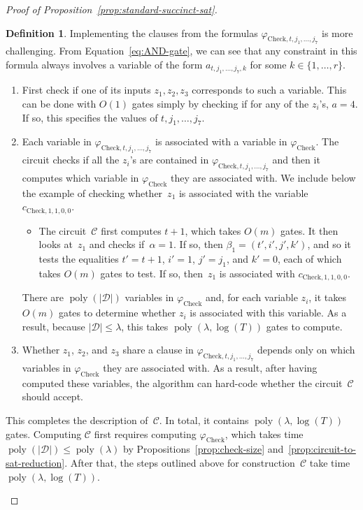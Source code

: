 \documentclass[11pt]{article}
\theoremstyle{definition}
\newtheorem{definition}[theorem]{Definition}
\DeclareMathOperator{\poly}{poly}
\newcommand{\decider}{\mathcal{D}}
\newcommand{\circuit}{\mathcal{C}}
\begin{document}
\begin{proof}[Proof of Proposition~\ref{prop:standard-succinct-sat}]
\begin{definition}
  Implementing the clauses from the formulas $\varphi_{\mathrm{Check}, t, j_1,
    \ldots, j_7}$ is more challenging.
  From Equation~\eqref{eq:AND-gate}, we can see that any constraint in this
  formula always involves a variable of the form $a_{t, j_1, \ldots, j_7, k}$
  for some $k \in \{1, \ldots, r\}$.
  \begin{enumerate}
  \item First check if one of its inputs $z_1, z_2, z_3$ corresponds to such a
    variable.
    This can be done with $O(1)$ gates simply by checking if for any of the
    $z_i$'s, $a = 4$.
    If so, this specifies the values of $t, j_1, \ldots, j_7$.
  \item Each variable in $\varphi_{\mathrm{Check}, t, j_1, \ldots, j_7}$ is
    associated with a variable in $\varphi_{\mathrm{Check}}$.
    The circuit checks if all the $z_i$'s are contained in
    $\varphi_{\mathrm{Check}, t, j_1, \ldots, j_7}$ and then it computes which
    variable in $\varphi_{\mathrm{Check}}$ they are associated with.
    We include below the example of checking whether~$z_1$ is associated with
    the variable $c_{\mathrm{Check},1, 1, 0, 0}$.
    \begin{itemize}
    \item The circuit~$\circuit$ first computes $t+1$, which takes $O(m)$ gates.
      It then looks at~$z_1$ and checks if~$\alpha=1$.
      If so, then $\beta_1 = (t', i', j', k')$, and so it tests the equalities
      $t' = t+1$, $i' = 1$, $j' = j_1$, and $k' = 0$, each of which takes $O(m)$
      gates to test.
      If so, then~$z_1$ is associated with $c_{\mathrm{Check},1, 1, 0, 0}$.
    \end{itemize}
    There are $\poly(|\decider|)$ variables in $\varphi_{\mathrm{Check}}$ and,
    for each variable $z_i$, it takes $O(m)$ gates to determine whether $z_i$ is
    associated with this variable.
    As a result, because $|\decider| \leq \lambda$, this takes $\poly(\lambda,
    \log(T))$ gates to compute.
  \item Whether $z_1$, $z_2$, and $z_3$ share a clause in
    $\varphi_{\mathrm{Check}, t, j_1, \ldots, j_7}$ depends only on which
    variables in $\varphi_{\mathrm{Check}}$ they are associated with.
    As a result, after having computed these variables, the algorithm can
    hard-code whether the circuit~$\circuit$ should accept.
  \end{enumerate}
  This completes the description of~$\circuit$.
  In total, it contains $\poly(\lambda, \log(T))$ gates.
  Computing $\circuit$ first requires computing $\varphi_{\mathrm{Check}}$,
  which takes time $\poly(|\decider|) \leq \poly(\lambda)$ by
  Propositions~\ref{prop:check-size} and~\ref{prop:circuit-to-sat-reduction}.
  After that, the steps outlined above for construction~$\circuit$ take
  time~$\poly(\lambda, \log(T))$.
\end{definition}


\end{proof}
\end{document}
